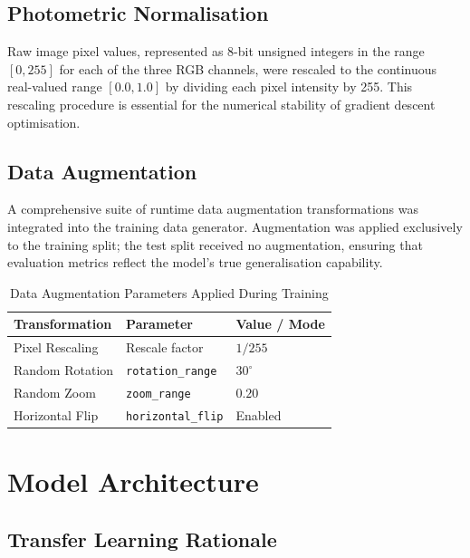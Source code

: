 \documentclass[12pt,a4paper]{report}
\begin{document}
\subsection{Photometric Normalisation}

Raw image pixel values, represented as 8-bit unsigned integers in the range $[0, 255]$ for each of the three RGB channels, were rescaled to the continuous real-valued range $[0.0, 1.0]$ by dividing each pixel intensity by 255. This rescaling procedure is essential for the numerical stability of gradient descent optimisation.

\subsection{Data Augmentation}

A comprehensive suite of runtime data augmentation transformations was integrated into the training data generator. Augmentation was applied exclusively to the training split; the test split received no augmentation, ensuring that evaluation metrics reflect the model's true generalisation capability.

\begin{table}[H]
\centering
\caption{Data Augmentation Parameters Applied During Training}
\label{tab:augmentation}
\begin{tabular}{lll}
\toprule
\textbf{Transformation} & \textbf{Parameter}            & \textbf{Value / Mode} \\
\midrule
Pixel Rescaling         & Rescale factor                & $1/255$               \\
Random Rotation         & \texttt{rotation\_range}      & $30^{\circ}$          \\
Random Zoom             & \texttt{zoom\_range}          & $0.20$                \\
Horizontal Flip         & \texttt{horizontal\_flip}     & Enabled               \\
\bottomrule
\end{tabular}
\end{table}

\section{Model Architecture}

\subsection{Transfer Learning Rationale}
\end{document}
